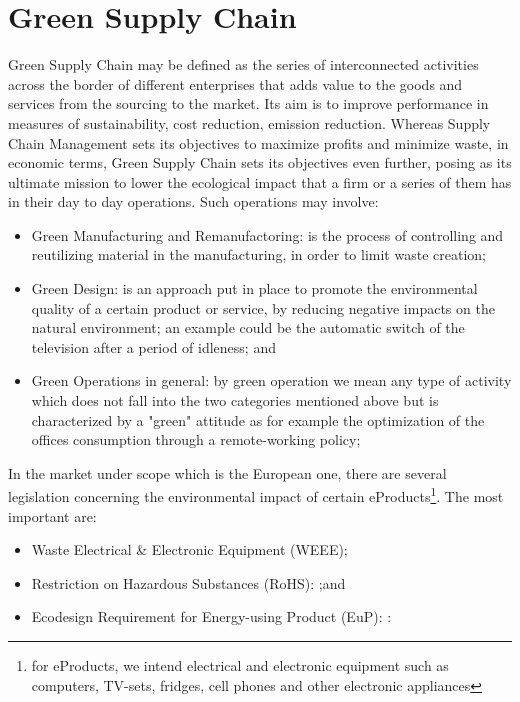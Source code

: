 \documentclass{article}
\begin{document}
\section{Green Supply Chain}
  Green Supply Chain may be defined as the series of interconnected activities across the border of different enterprises that adds value to the goods and services from the sourcing to the market. Its aim is to improve performance in measures of sustainability, cost reduction, emission reduction. Whereas Supply Chain Management sets its objectives to maximize profits and minimize waste, in economic terms, Green Supply Chain sets its objectives even further, posing as its ultimate mission to lower the ecological impact that a firm or a series of them has in their day to day operations. Such operations may involve:
  \begin{itemize}
    \item Green Manufacturing and Remanufactoring: is the process of controlling and reutilizing material in the manufacturing, in order to limit waste creation\cite{urvashi_green_2013};
    \item Green Design: is an approach put in place to promote the environmental quality of a certain product or service,  by reducing negative impacts on the natural environment; an example could be the automatic switch of the television after a period of idleness\cite{ceschin_evolution_2016}; and
    \item Green Operations in general: by green operation we mean any type of activity which does not fall into the two categories mentioned above but is characterized by a "green" attitude as for example the optimization of the offices consumption through a remote-working policy;
  \end{itemize}

  In the market under scope which is the European one, there are several legislation concerning the environmental impact of certain eProducts\footnote{for eProducts, we intend electrical and electronic equipment such as computers, TV-sets, fridges, cell phones and other electronic appliances}. The most important are:
  \begin{itemize}
    \item Waste Electrical \& Electronic Equipment (WEEE);
    \item Restriction on Hazardous Substances (RoHS): ;and
    \item Ecodesign Requirement for Energy-using Product (EuP): :
  \end{itemize}
\end{document}
